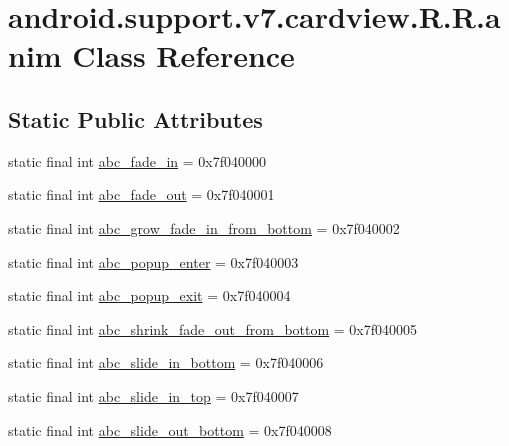 \hypertarget{classandroid_1_1support_1_1v7_1_1cardview_1_1_r_1_1anim}{
\section{android.support.v7.cardview.R.R.anim Class Reference}
\label{classandroid_1_1support_1_1v7_1_1cardview_1_1_r_1_1anim}
}
\subsection*{Static Public Attributes}
\begin{CompactItemize}
\item 
static final int \hyperlink{classandroid_1_1support_1_1v7_1_1cardview_1_1_r_1_1anim_d17ee038f86b4023bfe774e0ac8b64a0}{abc\_\-fade\_\-in} = 0x7f040000
\item 
static final int \hyperlink{classandroid_1_1support_1_1v7_1_1cardview_1_1_r_1_1anim_4dfab6238ca989c97d4a5ddb589c4ddb}{abc\_\-fade\_\-out} = 0x7f040001
\item 
static final int \hyperlink{classandroid_1_1support_1_1v7_1_1cardview_1_1_r_1_1anim_a9e0f6d449d27d5e28dc4260aa91fddb}{abc\_\-grow\_\-fade\_\-in\_\-from\_\-bottom} = 0x7f040002
\item 
static final int \hyperlink{classandroid_1_1support_1_1v7_1_1cardview_1_1_r_1_1anim_f2e0cb18d32d99c0603a073d5a172294}{abc\_\-popup\_\-enter} = 0x7f040003
\item 
static final int \hyperlink{classandroid_1_1support_1_1v7_1_1cardview_1_1_r_1_1anim_da3dc32564e024ed9ded9eea5482f021}{abc\_\-popup\_\-exit} = 0x7f040004
\item 
static final int \hyperlink{classandroid_1_1support_1_1v7_1_1cardview_1_1_r_1_1anim_64a265d623150ce91916f1ca67f74b09}{abc\_\-shrink\_\-fade\_\-out\_\-from\_\-bottom} = 0x7f040005
\item 
static final int \hyperlink{classandroid_1_1support_1_1v7_1_1cardview_1_1_r_1_1anim_7aea0c2a001bb3788340794bf5e776d6}{abc\_\-slide\_\-in\_\-bottom} = 0x7f040006
\item 
static final int \hyperlink{classandroid_1_1support_1_1v7_1_1cardview_1_1_r_1_1anim_9fb11d1cff3f71b588d3cf87264dfbd6}{abc\_\-slide\_\-in\_\-top} = 0x7f040007
\item 
static final int \hyperlink{classandroid_1_1support_1_1v7_1_1cardview_1_1_r_1_1anim_22528848cc660cfe1339f37b90053b23}{abc\_\-slide\_\-out\_\-bottom} = 0x7f040008
\item 

\end{CompactItemize}
